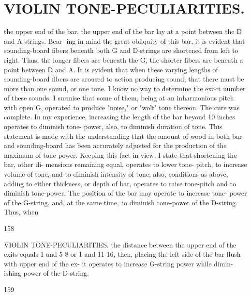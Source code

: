 \documentclass{article}
\begin{document}
\section*{VIOLIN TONE-PECULIARITIES.}
the upper end of the bar, the upper end of the bar lay at a point between the D and A-strings. Bear- ing in mind the great obliquity of this bar, it is evident that sounding-board fibers beneath both G and D-strings are shortened from left to right. Thus, the longer fibers are beneath the G, the shorter fibers are beneath a point between D and A. It is evident that when these varying lengths of sounding-board fibers are aroused to action producing sound, that there must be more than one sound, or one tone. I know no way to determine the exact number of these sounds. I surmise that some of them, being at an inharmonious pitch with open G, operated to produce "noise," or "wolf" tone thereon. The cure was complete. In my experience, increasing the length of the bar beyond 10 inches operates to diminish tone- power, also, to diminish duration of tone. This statement is made with the understanding that the amount of wood in both bar and sounding-board has been accurately adjusted for the production of the maximum of tone-power. Keeping this fact in view, I state that shortening the bar, other di- mensions remaining equal, operates to lower tone- pitch, to increase volume of tone, and to diminish intensity of tone; also, conditions as above, adding to either thickness, or depth of bar, operates to raise tone-pitch and to diminish tone-power. The position of the bar may operate to increase tone- power of the G-string, and, at the same time, to diminish tone-power of the D-string. Thus, when

158

VIOLIN TONE-PECULIARITIES. the distance between the upper end of the exits equals 1 and 5-8 or 1 and 11-16, then, placing the left side of the bar flush with upper end of the ex- it operates to increase G-string power while dimin- ishing power of the D-string.

159
\end{document}

